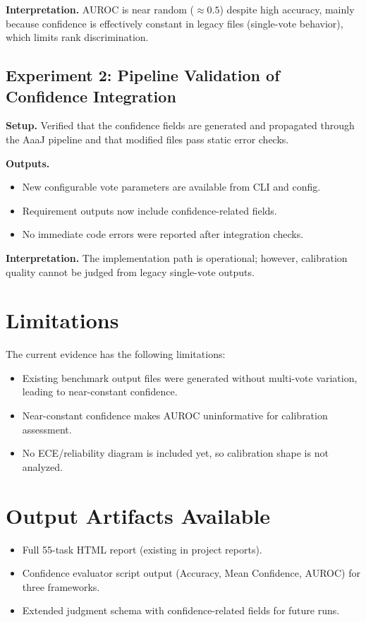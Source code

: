 \documentclass[11pt]{article}
\begin{document}
\textbf{Interpretation.} AUROC is near random ($\approx 0.5$) despite high accuracy, mainly because confidence is effectively constant in legacy files (single-vote behavior), which limits rank discrimination.

\subsection{Experiment 2: Pipeline Validation of Confidence Integration}
\textbf{Setup.} Verified that the confidence fields are generated and propagated through the AaaJ pipeline and that modified files pass static error checks.

\textbf{Outputs.}
\begin{itemize}[leftmargin=*]
    \item New configurable vote parameters are available from CLI and config.
    \item Requirement outputs now include confidence-related fields.
    \item No immediate code errors were reported after integration checks.
\end{itemize}

\textbf{Interpretation.} The implementation path is operational; however, calibration quality cannot be judged from legacy single-vote outputs.

\section{Limitations}
The current evidence has the following limitations:
\begin{itemize}[leftmargin=*]
    \item Existing benchmark output files were generated without multi-vote variation, leading to near-constant confidence.
    \item Near-constant confidence makes AUROC uninformative for calibration assessment.
    \item No ECE/reliability diagram is included yet, so calibration shape is not analyzed.
\end{itemize}

\section{Output Artifacts Available}
\begin{itemize}[leftmargin=*]
    \item Full 55-task HTML report (existing in project reports).
    \item Confidence evaluator script output (Accuracy, Mean Confidence, AUROC) for three frameworks.
    \item Extended judgment schema with confidence-related fields for future runs.
\end{itemize}
\end{document}
